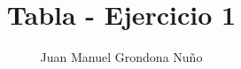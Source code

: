 \documentclass[14pt]{articule}
\begin{document}
\title{Tabla - Ejercicio 1}
\author{Juan Manuel Grondona Nu\~no}
\end{document}

